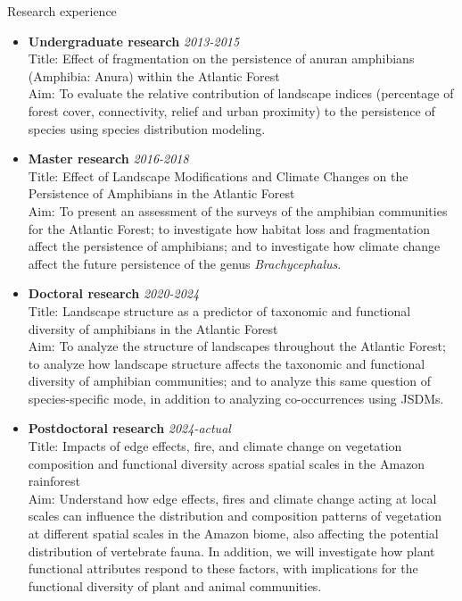\documentclass{resume}
\begin{document}

\begin{rSection}{Research experience}
\begin{itemize}
\item {\bf Undergraduate research} \hfill{\em 2013-2015}\\
Title: Effect of fragmentation on the persistence of anuran amphibians (Amphibia: Anura) within the Atlantic Forest\\
Aim: To evaluate the relative contribution of landscape indices (percentage of forest cover, connectivity, relief and urban proximity) to the persistence of species using species distribution modeling.

\item {\bf Master research} \hfill{\em 2016-2018}\\
Title: Effect of Landscape Modifications and Climate Changes on the Persistence of Amphibians in the Atlantic Forest\\
Aim: To present an assessment of the surveys of the amphibian communities for the Atlantic Forest; to investigate how habitat loss and fragmentation affect the persistence of amphibians; and to investigate how climate change affect the future persistence of the genus {\it Brachycephalus}.

\item {\bf Doctoral research} \hfill{\em 2020-2024}\\
Title: Landscape structure as a predictor of taxonomic and functional diversity of amphibians in the Atlantic Forest\\
Aim: To analyze the structure of landscapes throughout the Atlantic Forest; to analyze how landscape structure affects the taxonomic and functional diversity of amphibian communities; and to analyze this same question of species-specific mode, in addition to analyzing co-occurrences using JSDMs.

\item {\bf Postdoctoral research} \hfill{\em 2024-actual}\\
Title: Impacts of edge effects, fire, and climate change on vegetation composition and functional diversity across spatial scales in the Amazon rainforest\\
Aim: Understand how edge effects, fires and climate change acting at local scales can influence the distribution and composition patterns of vegetation at different spatial scales in the Amazon biome, also affecting the potential distribution of vertebrate fauna. In addition, we will investigate how plant functional attributes respond to these factors, with implications for the functional diversity of plant and animal communities.
\end{itemize}
\end{rSection}
\end{document}
